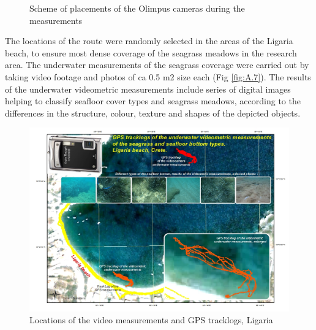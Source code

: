 \documentclass[11pt]{article}
\begin{document}
\begin{figure}[H]
	\centering
	\caption{Scheme of placements of the Olimpus cameras during the measurements}
	\label{fig:3.5}
\end{figure}
The locations of the route were randomly selected in the areas of the Ligaria beach, to ensure most dense
coverage of the seagrass meadows in the research area. The underwater measurements of the seagrass
coverage were carried out by taking video footage and photos of ca 0.5 m2 size each (Fig \ref{fig:A.7}).
The results of the underwater videometric measurements include series of digital images helping to
classify seafloor cover types and seagrass meadows, according to the differences in the structure,
colour, texture and shapes of the depicted objects.

\begin{figure}[H]
	\centering
	\includegraphics[scale=0.40]{Fig-21.jpg}
	\caption{Locations of the video measurements and GPS tracklogs, Ligaria}
	\label{fig:3.6}
\end{figure}
\end{document}
